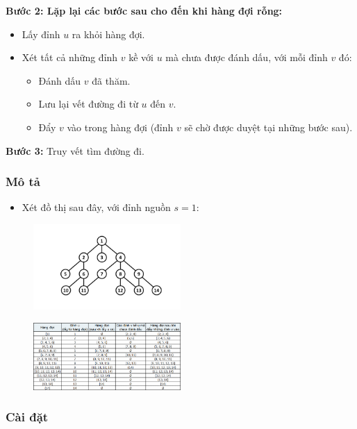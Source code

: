 \documentclass{article}
\begin{document}
\textbf{Bước 2: Lặp lại các bước sau cho đến khi hàng đợi rỗng:}
\begin{itemize}
    \item Lấy đỉnh $u$ ra khỏi hàng đợi.
    \item Xét tất cả những đỉnh $v$ kề với $u$ mà chưa được đánh dấu, với mỗi đỉnh $v$ đó:
    \begin{itemize}
        \item Đánh dấu $v$ đã thăm.
        \item Lưu lại vết đường đi từ $u$ đến $v$.
        \item Đẩy $v$ vào trong hàng đợi (đỉnh $v$ sẽ chờ được duyệt tại những bước sau).
    \end{itemize}
\end{itemize}

\textbf{Bước 3:} Truy vết tìm đường đi.

\subsubsection{Mô tả}

\begin{itemize}
    \item Xét đồ thị sau đây, với đỉnh nguồn $s = 1$:
\end{itemize}

\begin{figure}[h]
    \centering
    \includegraphics[width=0.5\textwidth]{img/b6/breadth-first-search_img3.png}
\end{figure}
\begin{figure}[h]
    \centering
    \includegraphics[width=0.5\textwidth]{img/b6/breadth-first-search_img4.png}
\end{figure}

\subsubsection{Cài đặt}
\end{document}
